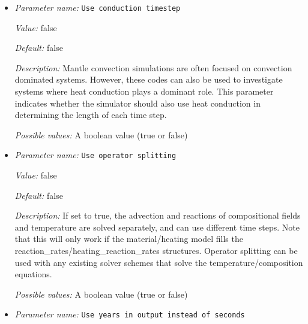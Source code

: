 \begin{itemize}
{\it Value:} 100


{\it Default:} 100


{\it Description:} How frequently in timesteps to output timing information. This is generally adjusted only for debugging and timing purposes. If the value is set to zero it will also output timing information at the initiation timesteps.


{\it Possible values:} An integer $n$ such that $0\leq n \leq 2147483647$
\item {\it Parameter name:} {\tt Use conduction timestep}
\label{parameters:Use conduction timestep}
\label{parameters:Use_20conduction_20timestep}


{\it Value:} false


{\it Default:} false


{\it Description:} Mantle convection simulations are often focused on convection dominated systems. However, these codes can also be used to investigate systems where heat conduction plays a dominant role. This parameter indicates whether the simulator should also use heat conduction in determining the length of each time step.


{\it Possible values:} A boolean value (true or false)
\item {\it Parameter name:} {\tt Use operator splitting}
\label{parameters:Use operator splitting}
\label{parameters:Use_20operator_20splitting}


{\it Value:} false


{\it Default:} false


{\it Description:} If set to true, the advection and reactions of compositional fields and temperature are solved separately, and can use different time steps. Note that this will only work if the material/heating model fills the reaction\_rates/heating\_reaction\_rates structures. Operator splitting can be used with any existing solver schemes that solve the temperature/composition equations.


{\it Possible values:} A boolean value (true or false)
\item {\it Parameter name:} {\tt Use years in output instead of seconds}
\label{parameters:Use years in output instead of seconds}
\label{parameters:Use_20years_20in_20output_20instead_20of_20seconds}



\end{itemize}
